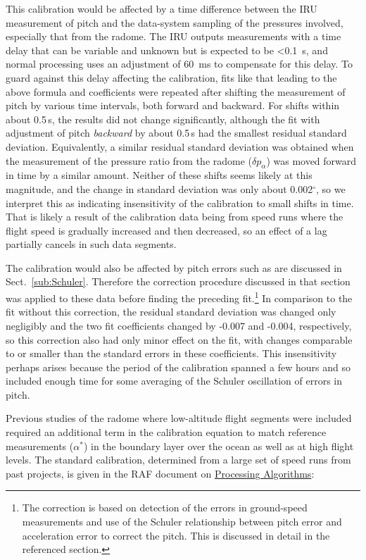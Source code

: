 \documentclass[12pt,twoside,english]{article}\usepackage[]{graphicx}\usepackage[]{color}
\let\OrgIndex\index
\renewcommand*{\index}[1]{\OrgIndex{#1}}
\begin{document}
{{This calibration would be affected by a time difference between the IRU measurement of pitch and the data-system sampling of the pressures involved, especially that from the radome. The IRU outputs measurements with a time delay that can be variable and unknown but is expected to be <0.1~s, and normal processing uses an adjustment of 60~ms to compensate for this delay. To guard against this delay affecting the calibration, fits like that leading to the above formula and coefficients were repeated after shifting the measurement of pitch by various time intervals, both forward and backward. For shifts within about 0.5\,s, the results did not change significantly, although the fit with adjustment of pitch \emph{backward} by about 0.5\,s had the smallest residual standard deviation. Equivalently, a similar residual standard deviation was obtained when the measurement of the pressure ratio from the radome ($\delta p_{\alpha}$) was moved forward in time by a similar amount. Neither of these shifts seems likely at this magnitude, and the change in standard deviation was only about 0.002$^{\circ}$, so we interpret this as indicating insensitivity of the calibration to small shifts in time. That is likely a result of the calibration data being from speed runs where the flight speed is gradually increased and then decreased, so an effect of a lag partially cancels in such data segments. 

The calibration would also be affected by pitch errors such as are discussed in Sect.~\ref{sub:Schuler}. Therefore the correction procedure discussed in that section was applied to these data before finding the preceding fit.\footnote{The correction is based on detection of the errors in ground-speed measurements and use of the Schuler relationship between pitch error and acceleration error to correct the pitch. This is discussed in detail in the referenced section.} In comparison to the fit without this correction, the residual standard deviation was changed only negligibly and the two fit coefficients changed by -0.007 and -0.004, respectively, so this correction also had only minor effect on the fit, with changes comparable to or smaller than the standard errors in these coefficients. This insensitivity perhaps arises because the period of the calibration spanned a few hours and so included enough time for some averaging of the Schuler oscillation of errors in pitch.




Previous studies of the radome where low-altitude flight segments were included required an additional term in the calibration equation to match reference measurements ($\alpha^{*}$) in the boundary layer over the ocean as well as at high flight levels. The standard calibration, determined from a large set of speed runs from past projects, is given in the RAF document on \href{https://drive.google.com/open?id=0B1kIUH45ca5Ab2Z6cld1M1cydjA&authuser=0}{Processing Algorithms}: 

}}
\end{document}
